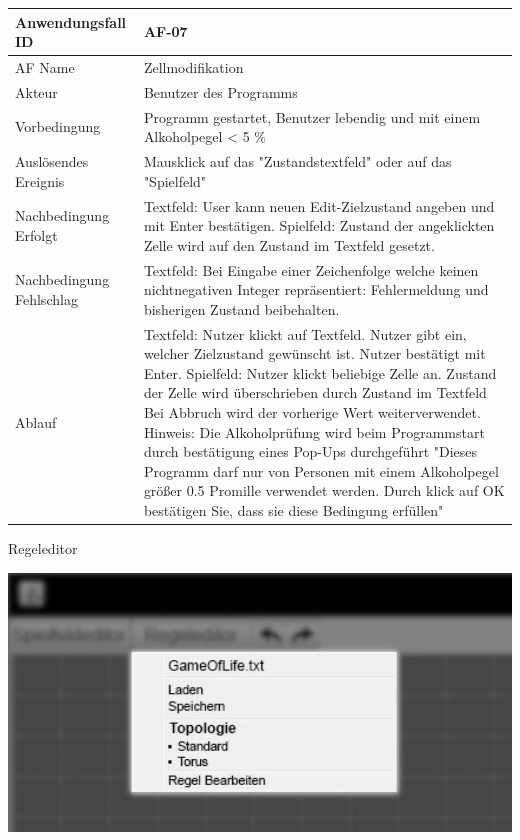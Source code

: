 \documentclass[11pt,a4paper]{article}
\begin{document}
\begin{tabular}[m]{|m{7cm}|m{9cm}|}
    \hline
    Anwendungsfall ID     & AF-07 \\
         \hline
    AF Name     & Zellmodifikation \\
         \hline
    Akteur&Benutzer des Programms \\
    \hline
    Vorbedingung&Programm gestartet, Benutzer lebendig und mit einem Alkoholpegel < 5 \% \\
    \hline
    Auslösendes Ereignis&Mausklick auf das "Zustandstextfeld" oder auf das "Spielfeld"\\
    \hline
    Nachbedingung Erfolgt& Textfeld: User kann neuen Edit-Zielzustand angeben und mit Enter bestätigen. Spielfeld: Zustand der angeklickten Zelle wird auf den Zustand im Textfeld gesetzt. \\
    \hline
    Nachbedingung Fehlschlag&Textfeld: Bei Eingabe einer Zeichenfolge welche keinen nichtnegativen Integer repräsentiert: Fehlermeldung und bisherigen Zustand beibehalten.\\
    \hline
    Ablauf&Textfeld: Nutzer klickt auf Textfeld. Nutzer gibt ein, welcher Zielzustand gewünscht ist. Nutzer bestätigt mit Enter. 
    \linebreak
    Spielfeld: Nutzer klickt beliebige Zelle an. Zustand der Zelle wird überschrieben durch Zustand im Textfeld
    Bei Abbruch wird der vorherige Wert weiterverwendet.
    \linebreak 
    Hinweis: Die Alkoholprüfung wird beim Programmstart durch bestätigung eines Pop-Ups durchgeführt "Dieses Programm darf nur von Personen mit einem Alkoholpegel größer 0.5 Promille verwendet werden. Durch klick auf OK bestätigen Sie, dass sie diese Bedingung erfüllen"\\
    \hline
    
\end{tabular}
\par

\pagebreak

    Regeleditor %

\par
\includegraphics[width=15cm]{regeleditor_dropdown_edit} %
\end{document}
